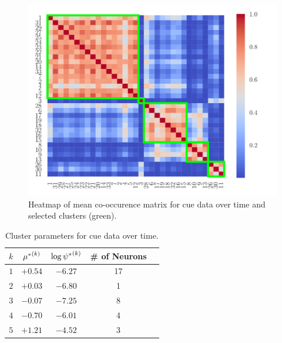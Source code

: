 \documentclass[twoside]{article}
\begin{document}
\begin{figure}[h]
\begin{center}
\includegraphics[scale=0.3]{../img/cue.pdf}
\end{center}
\caption{Heatmap of mean co-occurence matrix for cue data over time and selected clusters (green).} 
\label{cue-hm}
\end{figure}

\begin{table}[h]
\vspace{-3mm}
\caption{Cluster parameters for cue data over time.} \label{sample-table} \label{cue-table}
\begin{center}
\begin{tabular}{c|cccl}
$k$ & ${\mu^*}^{(k)}_{}$ & $\log {\psi^*}^{(k)}_{}$ &\# of Neurons \\
\hline
$1$ & $+0.54$ & $-6.27$ & 17  \\
$2$ &$+0.03$ & $-6.80$ & 1 \\
$3$ &$-0.07$ & $-7.25$  & 8 \\
$4$ &$-0.70$ & $-6.01$ & 4 \\
$5$ &$+1.21$ & $-4.52$ & 3 
\end{tabular}
\vspace{-4mm}
\end{center}\end{table}   
\end{document}
